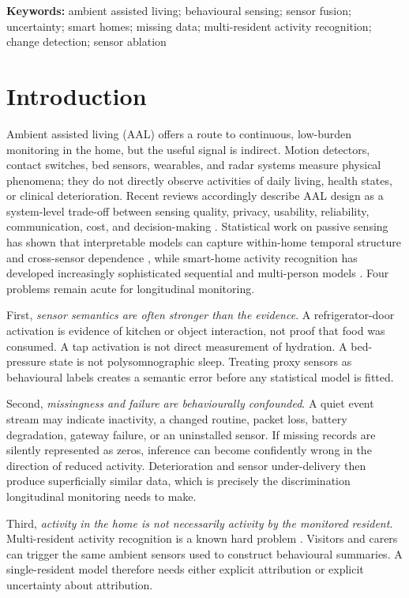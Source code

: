 \documentclass[11pt]{article}
\begin{document}
\noindent\textbf{Keywords:} ambient assisted living; behavioural sensing; sensor fusion; uncertainty; smart homes; missing data; multi-resident activity recognition; change detection; sensor ablation

\section{Introduction}

Ambient assisted living (AAL) offers a route to continuous, low-burden monitoring in the home, but the useful signal is indirect. Motion detectors, contact switches, bed sensors, wearables, and radar systems measure physical phenomena; they do not directly observe activities of daily living, health states, or clinical deterioration. Recent reviews accordingly describe AAL design as a system-level trade-off between sensing quality, privacy, usability, reliability, communication, cost, and decision-making \citep{zieni2025aal}. Statistical work on passive sensing has shown that interpretable models can capture within-home temporal structure and cross-sensor dependence \citep{gillam2022athome}, while smart-home activity recognition has developed increasingly sophisticated sequential and multi-person models \citep{asghari2019hhmm,wang2022multiperson}. Four problems remain acute for longitudinal monitoring.

First, \emph{sensor semantics are often stronger than the evidence}. A refrigerator-door activation is evidence of kitchen or object interaction, not proof that food was consumed. A tap activation is not direct measurement of hydration. A bed-pressure state is not polysomnographic sleep. Treating proxy sensors as behavioural labels creates a semantic error before any statistical model is fitted.

Second, \emph{missingness and failure are behaviourally confounded}. A quiet event stream may indicate inactivity, a changed routine, packet loss, battery degradation, gateway failure, or an uninstalled sensor. If missing records are silently represented as zeros, inference can become confidently wrong in the direction of reduced activity. Deterioration and sensor under-delivery then produce superficially similar data, which is precisely the discrimination longitudinal monitoring needs to make.

Third, \emph{activity in the home is not necessarily activity by the monitored resident}. Multi-resident activity recognition is a known hard problem \citep{wang2022multiperson,alemdar2013aras}. Visitors and carers can trigger the same ambient sensors used to construct behavioural summaries. A single-resident model therefore needs either explicit attribution or explicit uncertainty about attribution.
\end{document}
